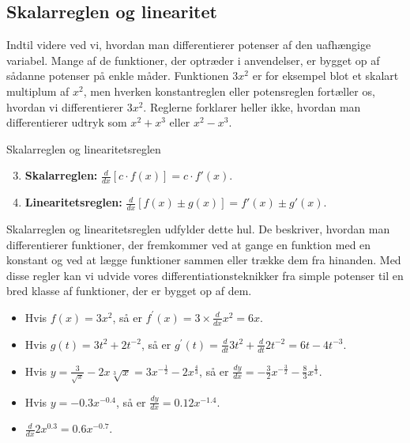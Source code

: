\subsection*{Skalarreglen og linearitet}

Indtil videre ved vi, hvordan man differentierer potenser af den uafhængige variabel. Mange af de funktioner, der optræder i anvendelser, er bygget op af sådanne potenser på enkle måder. Funktionen $3x^2$ er for eksempel blot et skalart multiplum af $x^2$, men hverken konstantreglen eller potensreglen fortæller os, hvordan vi differentierer $3x^2$. Reglerne forklarer heller ikke, hvordan man differentierer udtryk som $x^{2} + x^{3}$ eller $x^{2} - x^{3}$.

\begin{theorem}{Skalarreglen og linearitetsreglen}
    \begin{enumerate}
        \setcounter{enumi}{2}
        \vspace{0.5em}
        \item \textbf{Skalarreglen:} \( \frac{d}{dx}[c \cdot f(x)] = c \cdot f'(x) \). \vspace{0.5em}
        \item \textbf{Linearitetsreglen:} \( \frac{d}{dx}[f(x) \pm g(x)] = f'(x) \pm g'(x) \). \vspace{0.5em}
    \end{enumerate}
\end{theorem}

Skalarreglen og linearitetsreglen udfylder dette hul. De beskriver, hvordan man differentierer funktioner, der fremkommer ved at gange en funktion med en konstant og ved at lægge funktioner sammen eller trække dem fra hinanden. Med disse regler kan vi udvide vores differentiationsteknikker fra simple potenser til en bred klasse af funktioner, der er bygget op af dem.

\begin{example}
    \begin{itemize}
        \item Hvis \(f(x)=3 x^2\), så er \(f^{\prime}(x)=3 \times \frac{d}{d x} x^2=6 x\). \vspace{0.5em}
        \item Hvis \(g(t)=3 t^2+2 t^{-2}\), så er \(g^{\prime}(t)=\frac{d}{d t} 3 t^2+\frac{d}{d t} 2 t^{-2}=6 t-4 t^{-3}\). \vspace{0.5em}
        \item Hvis \(y=\frac{3}{\sqrt{x}}-2 x \sqrt[3]{x}=3 x^{-\frac{1}{2}}-2 x^{\frac{4}{3}}\), så er \(\frac{d y}{d x}=-\frac{3}{2} x^{-\frac{3}{2}}-\frac{8}{3} x^{\frac{1}{3}}\). \vspace{0.5em}
        \item Hvis \(y=-0.3 x^{-0.4}\), så er \(\frac{d y}{d x}=0.12 x^{-1.4}\). \vspace{0.5em}
        \item \(\frac{d}{d x} 2 x^{0.3}=0.6 x^{-0.7}\).
    \end{itemize}
    
\end{example}

